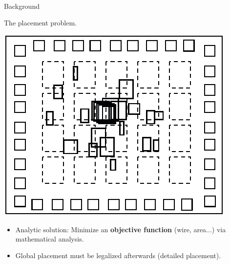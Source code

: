 \documentclass[serif, 12pt]{beamer}
\begin{document}
\begin{frame}{Background}

The placement problem.

\begin{center}
\includegraphics[scale=0.3]{analytic-placement.png}
\end{center}

\begin{itemize}
\item Analytic solution: Minimize an \textbf{objective function} (wire, area...) 
via mathematical analysis.
\item Global placement must be legalized afterwards (detailed placement).
\end{itemize}

\end{frame}
\end{document}
